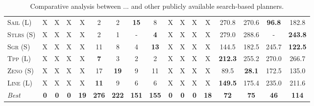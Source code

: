 \begin{table}[tb]
{\begin{tabular}{|l||cccccccc||cccccccc||}
\textsc{Sail} (L)&X&X&X&X&2&2&\textbf{15}&8&X&X&X&X&270.8&270.6&\textbf{96.8}&182.8\\
\textsc{Stlrs} (S)&X&X&X&X&2&1&-&\textbf{4}&X&X&X&X&279.0&288.6&-&\textbf{243.8}\\
\textsc{Sgr} (S)&X&X&X&X&11&8&4&\textbf{13}&X&X&X&X&144.5&182.5&245.7&\textbf{122.5}\\
\textsc{Tpp} (L)&X&X&X&X&\textbf{7}&3&2&2&X&X&X&X&\textbf{212.3}&255.2&270.0&266.7\\
\textsc{Zeno} (S)&X&X&X&X&17&\textbf{19}&9&11&X&X&X&X&89.5&\textbf{28.1}&172.5&135.0\\
\textsc{Line} (L)&X&X&X&X&\textbf{11}&9&6&6&X&X&X&X&\textbf{149.5}&175.4&235.0&211.6
\\\hline
\textit{Best}&\textbf{0}&\textbf{0}&\textbf{0}&\textbf{19}&\textbf{276}&\textbf{222}&\textbf{151}&\textbf{155}&\textbf{0}&\textbf{0}&\textbf{0}&\textbf{18}&\textbf{72}&\textbf{75}&\textbf{46}&\textbf{114}\\\hline

        \end{tabular}}
        \caption{Comparative analysis between ... and other publicly available search-based planners.}
        \label{tab:search}
        \end{table}
        